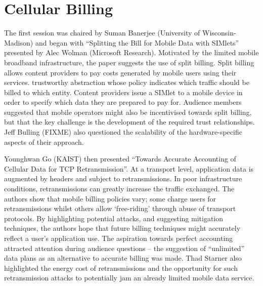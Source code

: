 \section{Cellular Billing}
\label{sec:cellbilling}

The first session was chaired by Suman Banerjee (University of Wisconsin-Madison)
and began with ``Splitting the Bill for Mobile Data with SIMlets'' presented by 
Alec Wolman (Microsoft Research). Motivated by the limited mobile broadband 
infrastructure, the paper suggests the use of split billing. Split billing allows 
content providers to pay costs generated by mobile users using their services.
trustworthy abstraction whose policy indicates which traffic should be billed to 
which entity. Content providers issue a SIMlet to a mobile device in order to 
specify which data they are prepared to pay for.
Audience members suggested that mobile operators might also be incentivised 
towards split billing, but that the key challenge is the development of the 
required trust relationships. Jeff Bulling (FIXME) also questioned the 
scalability of the hardware-specific aspects of their approach.

Younghwan Go (KAIST) then presented ``Towards Accurate Accounting of Cellular 
Data for TCP Retransmission''. At a transport level, application data
is augmented by headers and subject to retransmissions. In 
poor infrastructure conditions, retransmissions can greatly increase the traffic 
exchanged. The authors show that mobile billing policies vary; some charge users 
for retransmissions whilst others allow `free-riding' through abuse of transport 
protocols. By highlighting potential attacks, and suggesting mitigation 
techniques, the authors hope that future billing techniques might accurately 
reflect a user's application use.
The aspiration towards perfect accounting attracted attention during audience
questions -- the suggestion of ``unlimited'' data plans as an
alternative to accurate billing was made. Thad Starner also highlighted the 
energy cost of retransmissions %
and the opportunity for such retransmission attacks to potentially jam an already 
limited mobile data service.